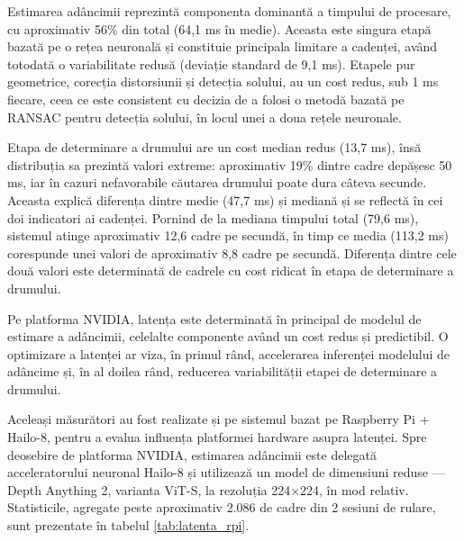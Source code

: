 Estimarea adâncimii reprezintă componenta dominantă a timpului de procesare, cu aproximativ 56\% din total (64,1 ms în medie). Aceasta este singura etapă bazată pe o rețea neuronală și constituie principala limitare a cadenței, având totodată o variabilitate redusă (deviație standard de 9,1 ms). Etapele pur geometrice, corecția distorsiunii și detecția solului, au un cost redus, sub 1 ms fiecare, ceea ce este consistent cu decizia de a folosi o metodă bazată pe RANSAC pentru detecția solului, în locul unei a doua rețele neuronale.

Etapa de determinare a drumului are un cost median redus (13,7 ms), însă distribuția sa prezintă valori extreme: aproximativ 19\% dintre cadre depășesc 50 ms, iar în cazuri nefavorabile căutarea drumului poate dura câteva secunde. Aceasta explică diferența dintre medie (47,7 ms) și mediană și se reflectă în cei doi indicatori ai cadenței. Pornind de la mediana timpului total (79,6 ms), sistemul atinge aproximativ 12,6 cadre pe secundă, în timp ce media (113,2 ms) corespunde unei valori de aproximativ 8,8 cadre pe secundă. Diferența dintre cele două valori este determinată de cadrele cu cost ridicat în etapa de determinare a drumului.

Pe platforma NVIDIA, latența este determinată în principal de modelul de estimare a adâncimii, celelalte componente având un cost redus și predictibil. O optimizare a latenței ar viza, în primul rând, accelerarea inferenței modelului de adâncime și, în al doilea rând, reducerea variabilității etapei de determinare a drumului.

Aceleași măsurători au fost realizate și pe sistemul bazat pe Raspberry Pi + Hailo-8, pentru a evalua influența platformei hardware asupra latenței. Spre deosebire de platforma NVIDIA, estimarea adâncimii este delegată acceleratorului neuronal Hailo-8 și utilizează un model de dimensiuni reduse — Depth Anything 2, varianta ViT-S, la rezoluția 224$\times$224, în mod relativ. Statisticile, agregate peste aproximativ 2.086 de cadre din 2 sesiuni de rulare, sunt prezentate în tabelul \ref{tab:latenta_rpi}.

